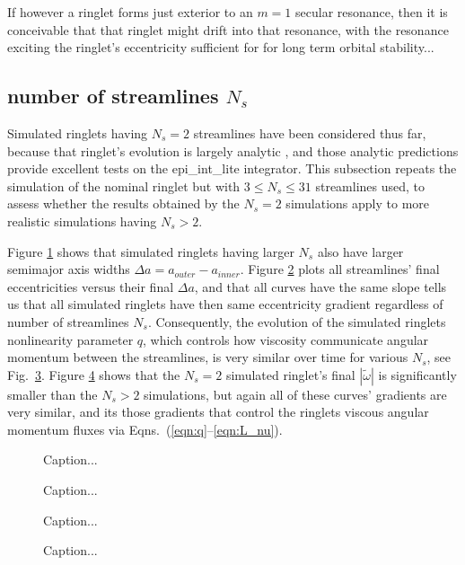 \documentclass[preprint]{aastex62}
\begin{document}
If however a ringlet forms just exterior to an $m=1$ secular resonance, then it is conceivable
that that ringlet might drift into that resonance, with the resonance
exciting the ringlet's eccentricity sufficient for
for long term orbital stability...


\subsection{number of streamlines $N_s$}
\label{subsec:streamlines}

Simulated ringlets having $N_s=2$ streamlines have been considered thus far, because that ringlet's
evolution is largely analytic \citep{BGT82, BGT83}, and those analytic
predictions provide excellent tests on the epi\_int\_lite integrator. This subsection repeats
the simulation of the nominal ringlet but with $3\le N_s\le31$ streamlines used, to assess
whether the results obtained by the $N_s=2$ simulations apply to more realistic simulations
having $N_s>2$.

Figure \ref{fig:a_versus_t_streamlines} shows that simulated ringlets having larger $N_s$
also have larger semimajor axis widths $\Delta a = a_{outer} - a_{inner}$. Figure 
\ref{fig:e_vs_da_streamlines} plots all streamlines' final eccentricities
versus their final $\Delta a$, and that all curves have the same slope
tells us that all simulated ringlets have then same eccentricity gradient regardless of 
number of streamlines $N_s$. Consequently, the evolution of the simulated ringlets
nonlinearity parameter $q$, which controls how viscosity communicate angular momentum between
the streamlines, is very similar over time for various $N_s$, see Fig.\ \ref{fig:q_versus_t_streamlines}.
Figure \ref{fig:wt_vs_da_streamlines} shows that the $N_s=2$ simulated ringlet's final $|\tilde{\omega}|$
is significantly smaller than the $N_s>2$ simulations, but again all of these curves' gradients
are very similar, and its those gradients that control the ringlets viscous angular momentum fluxes via
Eqns.\ (\ref{eqn:q}--\ref{eqn:L_nu}).
\begin{figure}
    \caption{
        \label{fig:a_versus_t_streamlines}
        Caption...
    }
\end{figure}
\begin{figure}
    \caption{
        \label{fig:e_vs_da_streamlines}
        Caption...
    }
\end{figure}
\begin{figure}
    \caption{
        \label{fig:q_versus_t_streamlines}
        Caption...
    }
\end{figure}
\begin{figure}
    \caption{
        \label{fig:wt_vs_da_streamlines}
        Caption...
    }
\end{figure}
\end{document}

